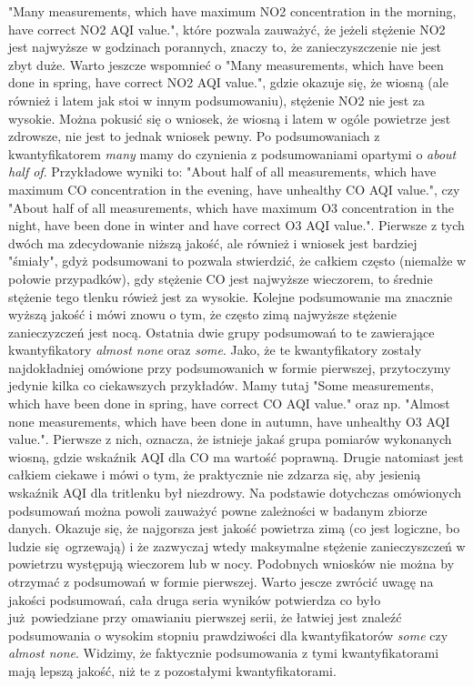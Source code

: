 \documentclass{classrep}
\begin{document}
{        "Many measurements, which have maximum NO2 concentration in the morning, have correct NO2
        AQI value.", które pozwala zauważyć, że jeżeli stężenie NO2 jest najwyższe w godzinach
        porannych, znaczy to, że zanieczyszczenie nie jest zbyt duże.  Warto jeszcze wspomnieć o
        "Many measurements, which have been done in spring, have correct NO2 AQI value.", gdzie
        okazuje się, że wiosną (ale również i latem jak stoi w innym podsumowaniu), stężenie NO2 nie
        jest za wysokie.  Można pokusić się o wniosek, że wiosną i latem w ogóle powietrze jest
        zdrowsze, nie jest to jednak wniosek pewny. Po podsumowaniach z kwantyfikatorem \emph{many}
        mamy do czynienia z podsumowaniami opartymi o \emph{about half of}. Przykładowe wyniki to:
        "About half of all measurements, which have maximum CO concentration in the evening, have
        unhealthy CO AQI value.", czy "About half of all measurements, which have maximum O3
        concentration in the night, have been done in winter and have correct O3 AQI value.".
        Pierwsze z tych dwóch ma zdecydowanie niższą jakość, ale również i wniosek jest bardziej
        "śmiały", gdyż podsumowani to pozwala stwierdzić, że całkiem często (niemalże w połowie
        przypadków), gdy stężenie CO jest najwyższe wieczorem, to średnie stężenie tego tlenku
        rówież jest za wysokie. Kolejne podsumowanie ma znacznie wyższą jakość i mówi znowu o tym,
        że często zimą najwyższe stężenie zanieczyzczeń jest nocą. Ostatnia dwie grupy podsumowań to
        te zawierające kwantyfikatory \emph{almost none} oraz \emph{some}. Jako, że te
        kwantyfikatory zostały najdokładniej omówione przy podsumowanich w formie pierwszej,
        przytoczymy jedynie kilka co ciekawszych przykładów. Mamy tutaj "Some measurements, which
        have been done in spring, have correct CO AQI value." oraz np.  "Almost none measurements,
        which have been done in autumn, have unhealthy O3 AQI value.". Pierwsze z nich, oznacza, że
        istnieje jakaś grupa pomiarów wykonanych wiosną, gdzie wskaźnik AQI dla CO ma wartość
        poprawną.  Drugie natomiast jest całkiem ciekawe i mówi o tym, że praktycznie nie zdzarza
        się, aby jesienią wskaźnik AQI dla tritlenku był niezdrowy.  Na podstawie dotychczas
        omówionych podsumowań można powoli zauważyć powne zależności w badanym zbiorze danych.
        Okazuje się, że najgorsza jest jakość powietrza zimą (co jest logiczne, bo ludzie
        się ogrzewają) i że zazwyczaj wtedy maksymalne stężenie zanieczyszczeń w powietrzu występują
        wieczorem lub w nocy. Podobnych wniosków nie można by otrzymać z podsumowań w formie
        pierwszej. Warto jescze zwrócić uwagę na jakości podsumowań, cała druga seria wyników
        potwierdza co było już powiedziane przy omawianiu pierwszej serii, że łatwiej jest znaleźć
        podsumowania o wysokim stopniu prawdziwości dla kwantyfikatorów \emph{some} czy \emph{almost
        none}. Widzimy, że faktycznie podsumowania z tymi kwantyfikatorami mają  lepszą jakość, niż
        te z pozostałymi kwantyfikatorami.

}
\end{document}
